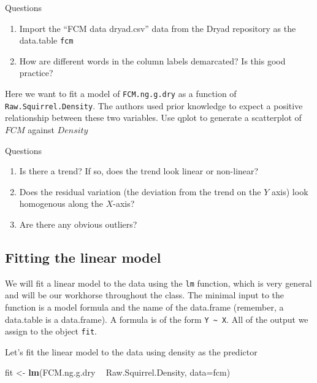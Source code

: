 \documentclass[]{book}
\newenvironment{Shaded}{\begin{snugshade}}{\end{snugshade}}
\newcommand{\KeywordTok}[1]{\textcolor[rgb]{0.13,0.29,0.53}{\textbf{#1}}}
\newcommand{\DataTypeTok}[1]{\textcolor[rgb]{0.13,0.29,0.53}{#1}}
\newcommand{\StringTok}[1]{\textcolor[rgb]{0.31,0.60,0.02}{#1}}
\newcommand{\OperatorTok}[1]{\textcolor[rgb]{0.81,0.36,0.00}{\textbf{#1}}}
\newcommand{\NormalTok}[1]{#1}
\providecommand{\tightlist}{%
  \setlength{\itemsep}{0pt}\setlength{\parskip}{0pt}}
\begin{document}
Questions

\begin{enumerate}
\def\labelenumi{\arabic{enumi}.}
\tightlist
\item
  Import the ``FCM data dryad.csv'' data from the Dryad repository as
  the data.table \texttt{fcm}
\item
  How are different words in the column labels demarcated? Is this good
  practice?
\end{enumerate}

Here we want to fit a model of \texttt{FCM.ng.g.dry} as a function of
\texttt{Raw.Squirrel.Density}. The authors used prior knowledge to
expect a positive relationship between these two variables. Use qplot to
generate a scatterplot of \(FCM\) against \(Density\)

Questions

\begin{enumerate}
\def\labelenumi{\arabic{enumi}.}
\setcounter{enumi}{2}
\tightlist
\item
  Is there a trend? If so, does the trend look linear or non-linear?
\item
  Does the residual variation (the deviation from the trend on the \(Y\)
  axis) look homogenous along the \(X\)-axis?
\item
  Are there any obvious outliers?
\end{enumerate}

\subsection{Fitting the linear model}\label{fitting-the-linear-model}

We will fit a linear model to the data using the \texttt{lm} function,
which is very general and will be our workhorse throughout the class.
The minimal input to the function is a model formula and the name of the
data.frame (remember, a data.table is a data.frame). A formula is of the
form \texttt{Y\ \textasciitilde{}\ X}. All of the output we assign to
the object \texttt{fit}.

Let's fit the linear model to the data using density as the predictor

\begin{Shaded}
\begin{Highlighting}[]
\NormalTok{  fit <-}\StringTok{ }\KeywordTok{lm}\NormalTok{(FCM.ng.g.dry }\OperatorTok{~}\StringTok{ }\NormalTok{Raw.Squirrel.Density, }\DataTypeTok{data=}\NormalTok{fcm)}
\end{Highlighting}
\end{Shaded}
\end{document}
